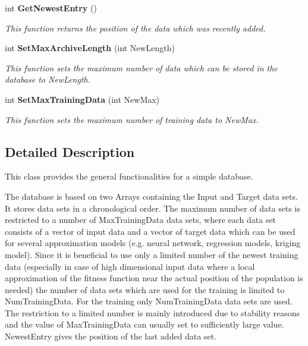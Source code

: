 \begin{CompactItemize}
int {\bf Get\-Newest\-Entry} ()
\begin{CompactList}\small\item\em This function returns the position of the data which was recently added.\item\end{CompactList}\item 
int {\bf Set\-Max\-Archive\-Length} (int New\-Length)
\begin{CompactList}\small\item\em This function sets the maximum number of data which can be stored in the database to New\-Length.\item\end{CompactList}\item 
int {\bf Set\-Max\-Training\-Data} (int New\-Max)
\begin{CompactList}\small\item\em This function sets the maximum number of training data to New\-Max.\item\end{CompactList}\end{CompactItemize}


\subsection{Detailed Description}
This class provides the general functionalities for a simple database.

The database is based on two Arrays containing the Input and Target data sets. It stores data sets in a chronological order. The maximum number of data sets is restricted to a number of Max\-Training\-Data data sets, where each data set consists of a vector of input data and a vector of target data which can be used for several approximation models (e.g. neural network, regression models, kriging model). Since it is beneficial to use only a limited number of the newest training data (especially in case of high dimensional input data where a local approximation of the fitness function near the actual position of the population is needed) the number of data sets which are used for the training is limited to Num\-Training\-Data. For the training only Num\-Training\-Data data sets are used. The restriction to a limited number is mainly introduced due to stability reasons and the value of Max\-Training\-Data can usually set to sufficiently large value. Newest\-Entry gives the position of the last added data set. 



